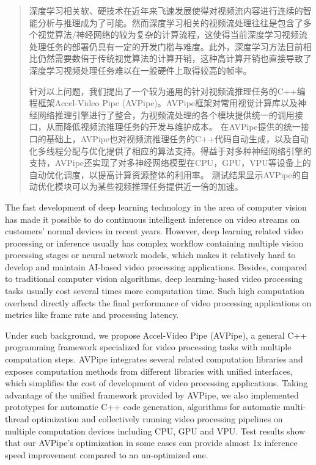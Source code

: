 
\begin{abstract}
深度学习相关软、硬技术在近年来飞速发展使得对视频流内容进行连续的智能分析与推理成为了可能。然而深度学习相关的视频流处理往往是包含了多个视觉算法/神经网络的较为复杂的计算流程，这使得当前深度学习视频流处理任务的部署仍具有一定的开发门槛与难度。此外，深度学习方法目前相比仍然需要数倍于传统视觉算法的计算开销，这种高计算开销也直接导致了深度学习视频处理任务难以在一般硬件上取得较高的帧率。\par
针对以上问题，我们提出了一个较为通用的针对视频流推理任务的C++编程框架Accel-Video Pipe (AVPipe)。AVPipe框架对常用视觉计算库以及神经网络推理引擎进行了整合，为视频流处理的各个模块提供统一的调用接口，从而降低视频流推理任务的开发与维护成本。
在AVPipe提供的统一接口的基础上，AVPipe也对视频流推理任务的C++代码自动生成，以及自动化多线程分配与优化提供了相应的算法支持。得益于对多种神经网络引擎的支持，AVPipe还实现了对多神经网络模型在CPU，GPU，VPU等设备上的自动优化调度，以提高计算资源整体的利用率。%
测试结果显示AVPipe的自动优化模块可以为某些视频推理任务提供近一倍的加速。
\end{abstract}

\begin{enabstract}
The fast development of deep learning technology in the area of computer vision has made it possible to do continuous intelligent inference on video streams on customers' normal devices in recent years. However, deep learning related video processing or inference usually has complex workflow containing multiple vision processing stages or neural network models, which makes it relatively hard to develop and maintain AI-based video processing applications. Besides, compared to traditional computer vision algorithms, deep learning-based video processing tasks usually cost several times more computation time. Such high computation overhead directly affects the final performance of video processing applications on metrics like frame rate and processing latency.

Under such background, we propose Accel-Video Pipe (AVPipe), a general C++ programming framework specialized for video processing tasks with multiple computation steps. AVPipe integrates several related computation libraries and exposes computation methods from different libraries with unified interfaces, which simplifies the cost of development of video processing applications. Taking advantage of the unified framework provided by AVPipe, we also implemented prototypes for automatic C++ code generation, algorithms for automatic multi-thread optimization and collectively running video processing pipelines on multiple computation devices including CPU, GPU and VPU. 
Test results show that our AVPipe's optimization in some cases can provide almost 1x inference speed improvement compared to an un-optimized one.
\end{enabstract}
